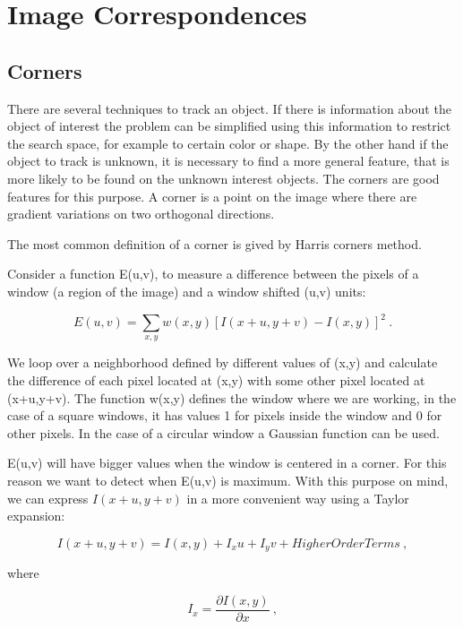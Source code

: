  


\section{Image Correspondences}

\subsection{Corners}

There are several techniques to track an object. If there is information about the object of interest the problem 
can be simplified using this information to restrict the search space, for example to certain color or shape.
 By the other hand if the object to track is unknown, it is necessary to find a more general feature, that is 
more likely to be found on the unknown interest objects. The corners are good features for this purpose. A corner 
is a point on the image where there are gradient variations on two orthogonal directions.

The most common definition of a corner is gived by Harris corners method.

Consider a function E(u,v), to measure a difference between the pixels of a window (a region of the image) and 
a window shifted (u,v) units:

\begin{equation}
E(u,v) = \sum\limits_{x,y} { w(x,y) [I(x + u, y +v) - I(x,y)]^2  }\ .
\label{eq:harris1}
\end{equation}

We loop over a neighborhood defined by different values of (x,y) and calculate 
the difference of each pixel located at (x,y) with some other pixel located at (x+u,y+v). 
The function w(x,y) defines the window where we are working, in the case of a square windows, 
it has values 1 for pixels inside the window and 0 for other pixels. In the case of a circular 
window a Gaussian function can be used. 

E(u,v) will have bigger values when the window is centered in a corner. For this reason we want 
to detect when E(u,v) is maximum. With this purpose on mind, we can express $I(x + u, y +v)$ in a more convenient
 way using a Taylor expansion:

$$
I(x+u,y +v) = I(x,y) + I_xu + I_yv + Higher Order Terms \ ,
$$ 

\noindent where 

$$
I_x = \frac{\partial{I(x,y)}}{\partial{x}}\ ,
$$

